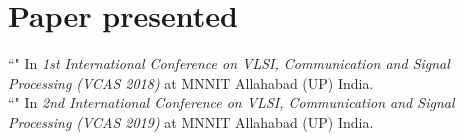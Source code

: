 \vspace{-2.5em}
\section{Paper presented}
``" In {\sl 1st International Conference on VLSI, Communication and Signal Processing (VCAS 2018)} at MNNIT Allahabad (UP) India. \\

\vspace{-1.5em}
``" In {\sl 2nd International Conference on VLSI, Communication and Signal Processing (VCAS 2019)} at MNNIT Allahabad (UP) India. \\
\vspace{-1em}
\sectionline
